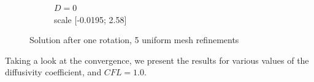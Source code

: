 \documentclass[mathserif]{beamer}
\begin{document}
\begin{frame}
\begin{figure}[H]
\begin{subfigure}[H]{0.3\textwidth}
		\vspace{-3mm}
		\caption{$D = 0$\\\vspace{-2mm}scale [-0.0195; 2.58]}
	\end{subfigure}
	\vspace{-3mm}
	\caption{Solution after one rotation, 5 uniform mesh refinements}	
\end{figure}

\end{frame}



\begin{frame}
Taking a look at the convergence, we present the results for various values of the diffusivity coefficient, and $CFL=1.0$.
\begin{figure}[H]
\centering
	\begin{subfigure}[H]{0.02\textwidth}

\end{subfigure}
\end{figure}
\end{frame}
\end{document}
